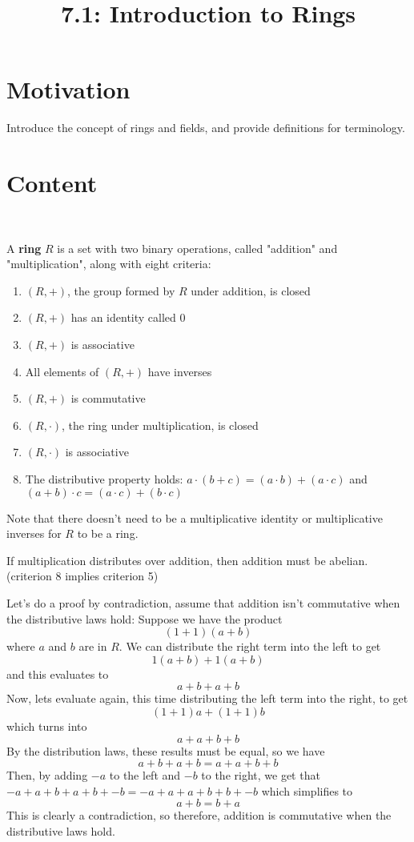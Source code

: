 \documentclass{article}
\title{7.1: Introduction to Rings}
\begin{document}
\maketitle
\section{Motivation}
Introduce the concept of rings and fields, and provide definitions for terminology.

\section{Content}
\ 
\begin{definition}[Rings]
A \textbf{ring} $R$ is a set with two binary operations, called "addition" and "multiplication", along with eight criteria:

\begin{enumerate}
    \item $(R,+)$, the group formed by $R$ under addition, is closed
    \item $(R,+)$ has an identity called $0$
    \item $(R,+)$ is associative
    \item All elements of $(R,+)$ have inverses
    \item $(R,+)$ is commutative
    \item $(R,\cdot)$, the ring under multiplication, is closed
    \item $(R,\cdot)$ is associative
    \item The distributive property holds: $a \cdot (b + c) = (a\cdot b) + (a\cdot c)$ and $(a+b)\cdot c = (a\cdot c) + (b\cdot c)$
\end{enumerate}
\end{definition}

Note that there doesn't need to be a multiplicative identity or multiplicative inverses for $R$ to be a ring.

\begin{proposition}
If multiplication distributes over addition, then addition must be abelian. (criterion 8 implies criterion 5)
\end{proposition}

\begin{customproof}
Let's do a proof by contradiction, assume that addition isn't commutative when the distributive laws hold: Suppose we have the product $$(1+1)(a+b)$$where $a$ and $b$ are in $R$. We can distribute the right term into the left to get $$1(a+b) + 1(a+b)$$and this evaluates to$$a+b+a+b$$Now, lets evaluate again, this time distributing the left term into the right, to get $$(1+1)a + (1+1)b$$which turns into$$a+a+b+b$$By the distribution laws, these results must be equal, so we have$$a+b+a+b = a+a+b+b$$Then, by adding $-a$ to the left and $-b$ to the right, we get that $-a+a+b+a+b+-b = -a+a+a+b+b+-b$ which simplifies to $$a+b = b+a$$This is clearly a contradiction, so therefore, addition is commutative when the distributive laws hold. 
\end{customproof}
\end{document}
